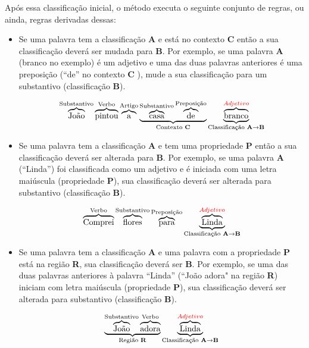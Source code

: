 Após essa classificação inicial, o método executa o seguinte conjunto de
regras, ou ainda, regras derivadas dessas:

\begin{itemize}
  \item Se uma palavra tem a classificação \textbf{A} e está no contexto
  \textbf{C} então a sua classificação deverá ser mudada para \textbf{B}. Por
  exemplo, se uma palavra \textbf{A} (branco no exemplo) é um adjetivo e uma das
  duas palavras anteriores é uma preposição (``de'' no contexto \textbf{C}
  ), mude a sua classificação para um substantivo (classificação \textbf{B}).
  
  \[\overbrace{\text{João}}^\text{Substantivo}
  \overbrace{\text{pintou}}^\text{Verbo}
  \overbrace{\text{a}}^\text{Artigo}
  \underbrace{
  \overbrace{\text{casa}}^\text{Substantivo}
  \overbrace{\text{de}}^\text{Preposição}}_\text{Contexto \textbf{C}}
  \underbrace{\overbrace{\text{branco}}^{\textcolor{red}{Adjetivo}}}_\text{Classificação
  \textbf{A}\textrightarrow\textbf{B}}
  \]
  
  \item Se uma palavra tem a classificação \textbf{A} e tem uma propriedade
  \textbf{P} então a sua classificação deverá ser alterada para \textbf{B}. Por
  exemplo, se uma palavra \textbf{A} (``Linda'') foi classificada como um
  adjetivo e é iniciada com uma letra maiúscula (propriedade \textbf{P}), sua
  classificação deverá ser alterada para substantivo (classificação \textbf{B}).
  
  \[\overbrace{\text{Comprei}}^\text{Verbo}
  \overbrace{\text{flores}}^\text{Substantivo}
  \overbrace{\text{para}}^\text{Preposição}
  \underbrace{\overbrace{\text{L}\text{inda}}^{\textcolor{red}{Adjetivo}}}_\text{Classificação
  \textbf{A}\textrightarrow\textbf{B}}
  \]
  
  \item Se uma palavra tem a classificação \textbf{A} e uma palavra com a
  propriedade \textbf{P} está na região \textbf{R}, sua classificação deverá
  ser \textbf{B}. Por exemplo, se uma das duas palavras anteriores à palavra
  ``Linda'' (``João adora" na região \textbf{R}) iniciam com letra maiúscula
  (propriedade \textbf{P}), sua classificação deverá ser alterada para substantivo (classificação \textbf{B}).
  
  \[\underbrace{\overbrace{\text{João}}^\text{Substantivo}
  \overbrace{\text{adora}}^\text{Verbo}}_\text{Região \textbf{R}}
  \underbrace{\overbrace{\text{L}\text{inda}}^{\textcolor{red}{Adjetivo}}}_\text{Classificação
  \textbf{A}\textrightarrow\textbf{B}}
  \]
  
  
\end{itemize}

